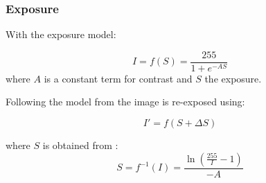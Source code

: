 \subsubsection{Exposure}

With the exposure model:
 
\begin{equation}
 I = f(S) = \frac{255}{1 + e^{-A S}}
\end{equation}
where $A$ is a constant term for contrast and $S$ the exposure.

Following the model from \cite{Carlson2018} the image is re-exposed using:

\begin{equation}
	I' = f(S+\Delta S)
\end{equation}

where $S$ is obtained from :
\begin{equation}
S = f^{-1}(I) = \frac{\ln(\frac{255}{I}-1)}{-A}
\end{equation}

